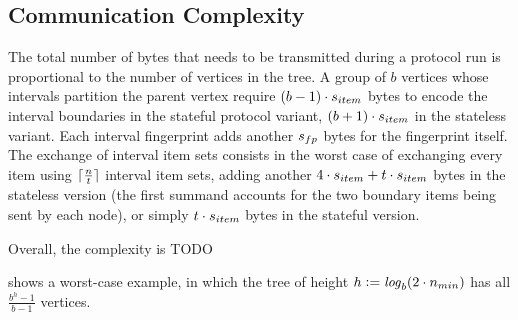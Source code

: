 \subsection{Communication Complexity}

The total number of bytes that needs to be transmitted during a protocol run is proportional to the number of vertices in the tree. A group of $b$ vertices whose intervals partition the parent vertex require $(b - 1) \cdot s_{item}$ bytes to encode the interval boundaries in the stateful protocol variant, $(b + 1) \cdot s_{item}$ in the stateless variant. Each interval fingerprint adds another $s_{fp}$ bytes for the fingerprint itself. The exchange of interval item sets consists in the worst case of exchanging every item using $\lceil\frac{n}{t}\rceil$ interval item sets, adding another $4 \cdot s_{item} + t \cdot s_{item}$ bytes in the stateless version (the first summand accounts for the two boundary items being sent by each node), or simply $t \cdot s_{item}$ bytes in the stateful version.

Overall, the complexity is TODO

 shows a worst-case example, in which the tree of height $h \vcentcolon= \mathit{log}_{b}(2 \cdot n_{min})$ has all $\frac{b^{h} - 1}{b - 1}$ vertices. 

